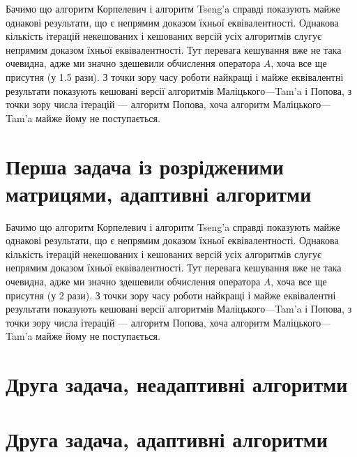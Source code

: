 Бачимо що алгоритм Корпелевич і алгоритм Tseng'a справді показують майже однакові результати, що є непрямим доказом їхньої еквівалентності. Однакова кількість ітерацій некешованих і кешованих версій усіх алгоритмів слугує непрямим доказом їхньої еквівалентності. Тут перевага кешування вже не така очевидна, адже ми значно здешевили обчислення оператора $A$, хоча все ще присутня (у 1.5 рази). З точки зору часу роботи найкращі і майже еквівалентні результати показують кешовані версії алгоритмів Маліцького---Tam'a і Попова, з точки зору числа ітерацій --- алгоритм Попова, хоча алгоритм Маліцького---Tam'a майже йому не поступається.

\section{Перша задача із розрідженими матрицями, адаптивні алгоритми}



Бачимо що алгоритм Корпелевич і алгоритм Tseng'a справді показують майже однакові результати, що є непрямим доказом їхньої еквівалентності. Однакова кількість ітерацій некешованих і кешованих версій усіх алгоритмів слугує непрямим доказом їхньої еквівалентності. Тут перевага кешування вже не така очевидна, адже ми значно здешевили обчислення оператора $A$, хоча все ще присутня (у 2 рази). З точки зору часу роботи найкращі і майже еквівалентні результати показують кешовані версії алгоритмів Маліцького---Tam'a і Попова, з точки зору числа ітерацій --- алгоритм Попова, хоча алгоритм Маліцького---Tam'a майже йому не поступається.

\section{Друга задача, неадаптивні алгоритми}





\section{Друга задача, адаптивні алгоритми}

